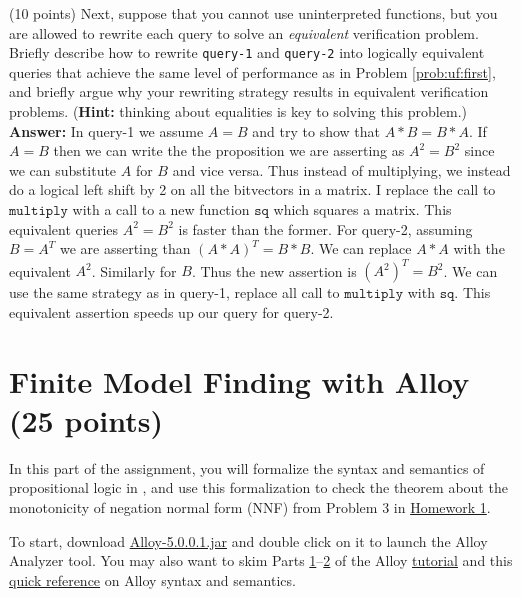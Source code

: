 \documentclass{handout}
\begin{document}
\begin{questions}
\item \label{prob:uf:last} (10 points)  Next, suppose that you cannot use
uninterpreted functions, but you are allowed to rewrite each query to solve an
\emph{equivalent} verification problem.  Briefly describe how to rewrite
\texttt{query-1} and \texttt{query-2} into logically equivalent queries that
achieve the same level of performance as in Problem \ref{prob:uf:first}, and
briefly argue why your rewriting strategy results in equivalent verification
problems. (\textbf{Hint:}  thinking about equalities is key to solving this
problem.)\\
\textbf{Answer:}
In query-1 we assume $A = B$ and try to show that $A * B = B * A$. If $A = B$ then we can write the the proposition we are asserting as $ A^2 = B^2$ since we can substitute $A$ for $B$ and vice versa. Thus instead of multiplying, we instead do a logical left shift by 2 on all the bitvectors in a matrix. I replace the call to $\mathtt{multiply}$ with a call to a new function $\mathtt{sq}$ which squares a matrix. This equivalent queries $A^2 = B^2$ is faster than the former. For query-2, assuming $B = A^T$ we are asserting than $(A*A)^T = B * B$. We can replace $A*A$ with the equivalent $A^2$. Similarly for $B$. Thus the new assertion is $(A^2)^T = B^2$. We can use the same strategy as in query-1, replace all call to $\mathtt{multiply}$ with $\mathtt{sq}$. This equivalent assertion speeds up our query for query-2. 



\end{questions}

\section{Finite Model Finding with Alloy (25 points)}

In this part of the assignment, you will formalize the syntax and semantics of
propositional logic in \alloy, and use this formalization to check the theorem
about the monotonicity of negation normal form (NNF) from Problem 3 in
\href{\website/doc/hw1.pdf}{Homework 1}.

To start, download
\href{https://github.com/AlloyTools/org.alloytools.alloy/releases/download/v5.0.0.1/Alloy-5.0.0.1.jar}{Alloy-5.0.0.1.jar}
and double click on it to launch the Alloy Analyzer tool.  You may also want to
skim Parts
\href{http://alloytools.org/tutorials/day-course/s1_logic.pdf}{1}--\href{http://alloytools.org/tutorials/day-course/s2_language.pdf}{2}
of the Alloy \href{http://alloytools.org/tutorials/day-course/}{tutorial} and
this
\href{http://homepage.cs.uiowa.edu/~tinelli/classes/181/Fall17/Notes/alloy-cheatsheet.pdf}{quick
reference} on Alloy syntax and semantics.
\end{document}

